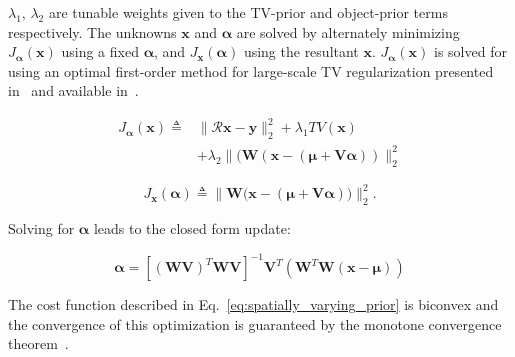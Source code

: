 \documentclass[journal]{IEEEtran}
\def\x{{\mathbf x}}
\begin{document}
$\lambda_1$, $\lambda_2$ are tunable weights given to the
TV-prior and object-prior terms respectively. The unknowns
$\boldsymbol{\x}$ and $\boldsymbol{\alpha}$ are solved by alternately
minimizing $J_{\boldsymbol{\alpha}}(\boldsymbol{\x})$ using a fixed
$\boldsymbol{\alpha}$, and $J_{\boldsymbol{x}}(\boldsymbol{\alpha})$
using the resultant $\boldsymbol{\x}$.
$J_{\boldsymbol{\alpha}}(\boldsymbol{\x})$ is solved for using an
optimal first-order method for large-scale TV regularization presented
in~\cite{TVReg} and available in~\cite{TVReg-lib}.

\begin{equation}
  \begin{split}
    J_{\boldsymbol{\alpha}}(\boldsymbol{\x}) \triangleq &\lVert\boldsymbol{\mathcal{R} x- y}\rVert_2^2  + \lambda_1TV(\boldsymbol{x}) \\
    &+\lambda_2\lVert(\boldsymbol{W}(\boldsymbol{x} - (\boldsymbol{\mu + V\alpha}))\rVert_2^2
  \end{split}
  \end{equation}
  
\begin{equation}
J_{\boldsymbol{x}}(\boldsymbol{\alpha}) \triangleq \lVert\boldsymbol{\boldsymbol{W}(\boldsymbol{x}} - (\boldsymbol{\mu + V\alpha}))\rVert_2^2.
\end{equation}

Solving for $\boldsymbol{\alpha}$ leads to the closed form update:

\begin{equation}
\boldsymbol{\alpha} = [(\boldsymbol{WV})^T\boldsymbol{WV}]^{-1}\boldsymbol{V}^T(\boldsymbol{W}^T\boldsymbol{W}(\boldsymbol{x} - \boldsymbol{\mu}))
\end{equation}

The cost function described in Eq.~\ref{eq:spatially_varying_prior} is biconvex and the convergence of this optimization is guaranteed by the monotone convergence theorem~\cite{monotone}.
\end{document}
